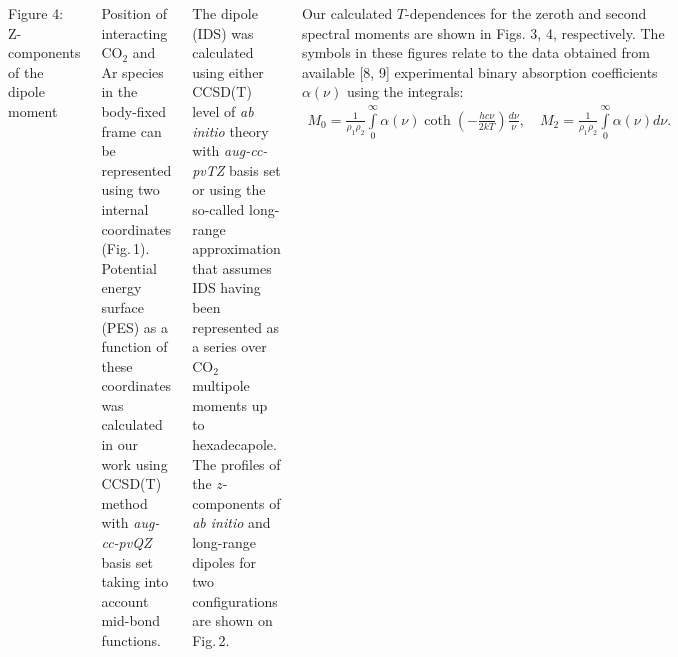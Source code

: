 \documentclass[
  20pt,
  a0paper,
  portrait,
  margin=0mm,
  innermargin=15mm,
  blockverticalspace=0mm,
  colspace=0mm,
  subcolspace=0mm
]{tikzposter}
\newcommand{\lb}{\left(}
\newcommand{\rb}{\right)}
\newcommand{\vpravo}{\hspace{1.5cm}}
\newcommand{\vverh}{\vspace*{-0.05cm}}
\begin{document}
\begin{columns}
{{\begin{minipage}{0.6\linewidth}
\vspace{1cm}
\begin{tikzfigure}
		\includegraphics[width=\linewidth]{../pictures/dipole_pictures/last-crop.pdf}
\end{tikzfigure}
\begin{center}
\vspace*{-0.5cm}
Figure 4: Z-components of the dipole moment \label{fig:dipole}
\end{center}

\end{minipage}
\hspace{1cm}
\begin{minipage}{0.37\linewidth}
\vspace*{-3cm}
\vpravo Position of interacting CO$_2$ and Ar species in the body-fixed frame can be represented using two internal coordinates (Fig.\,1). Potential energy surface (PES) as a function of these coordinates was calculated in our work using CCSD(T) method with \textit{aug-cc-pvQZ} basis set taking into account mid-bond functions. \par 
\vpravo The dipole (IDS) was calculated using either CCSD(T) level of \textit{ab initio} theory with \textit{aug-cc-pvTZ} basis set or using the so-called long-range approximation that assumes IDS having been represented as a series over CO$_2$ multipole moments up to hexadecapole. The profiles of the $z$-components of \textit{ab initio} and long-range dipoles for two configurations are shown on Fig.\,2.
\end{minipage}

\vspace{0.5cm}
\vpravo Our calculated $T$-dependences for the zeroth and second spectral moments are shown in Figs. 3, 4, respectively. The symbols in these figures relate to the data obtained from available [8, 9] experimental binary absorption coefficients $\alpha(\nu)$ using the integrals:
\vverh
\begin{gather}
		M_0 = \frac{1}{\rho_1 \rho_2} \int\limits_{0}^{\infty} \alpha(\nu) \coth \lb - \frac{h c \nu}{2 k T} \rb \frac{d \nu}{\nu}, \quad M_2 = \frac{1}{\rho_1 \rho_2} \int\limits_{0}^{\infty} \alpha(\nu) d \nu. \label{eq:m2_spectra}
\end{gather}

}}
\end{columns}
\end{document}
